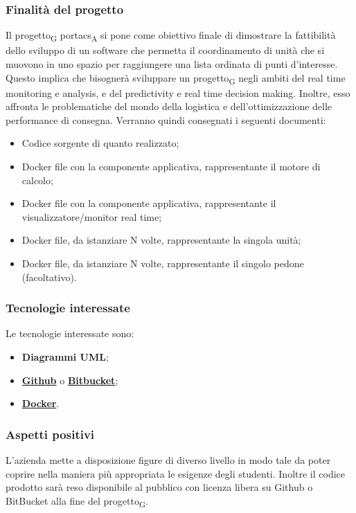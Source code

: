 \subsubsection{Finalità del progetto}
Il progetto\textsubscript{G} portacs\textsubscript{A} si pone come obiettivo finale di dimostrare la fattibilità dello sviluppo di un software che permetta il coordinamento di unità che si muovono in uno spazio per raggiungere una lista ordinata di punti d'interesse. Questo implica che bisognerà sviluppare un progetto\textsubscript{G} negli ambiti del real time monitoring e analysis, e del predictivity e real time decision making. Inoltre, esso affronta le problematiche del mondo della logistica e dell'ottimizzazione delle performance di consegna.
Verranno quindi consegnati i seguenti documenti:
\begin{itemize}
	\item Codice sorgente di quanto realizzato;
	\item Docker file con la componente applicativa, rappresentante il motore di calcolo;
	\item Docker file con la componente applicativa, rappresentante il visualizzatore/monitor real time;
	\item Docker file, da istanziare N volte, rappresentante la singola unità;
	\item Docker file, da istanziare N volte, rappresentante il singolo pedone (facoltativo).
\end{itemize}
\subsubsection{Tecnologie interessate}
Le tecnologie interessate sono:
\begin{itemize}
	\item \textbf{Diagrammi UML};
	\item \textbf{\href{https://github.com/about}{Github}} o \textbf{\href{https://bitbucket.org/product/guides/getting-started/overview}{Bitbucket}};	
	\item \textbf{\href{https://www.docker.com/why-docker}{Docker}}.
\end{itemize}
\subsubsection{Aspetti positivi}
L'azienda mette a disposizione figure di diverso livello in modo tale da poter coprire nella maniera più appropriata le esigenze degli studenti.
Inoltre il codice prodotto sarà reso disponibile al pubblico con licenza libera su Github o BitBucket alla fine del progetto\textsubscript{G}.
